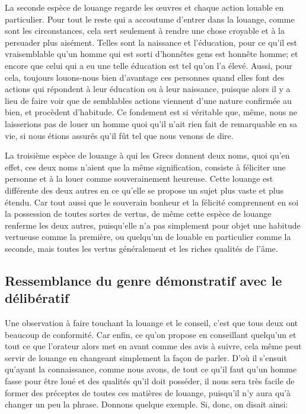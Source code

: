 La seconde espèce de louange regarde les œuvres et chaque action louable en particulier. Pour tout le reste qui a
accoutume d'entrer dans la louange, comme sont les circonstances, cela sert seulement à rendre une chose croyable
et à la persuader plus aisément. Telles sont la naissance et l'éducation, pour ce qu'il est vraisemblable qu'un
homme qui est sorti d'honnêtes gens est honnête homme; et encore que celui qui a eu une telle éducation est tel
qu'on l'a élevé. Aussi, pour cela, toujours louons-nous bien d'avantage ces personnes quand elles font des actions
qui répondent à leur éducation ou à leur naissance, puisque alors il y a lieu de faire voir que de semblables
actions viennent d'une nature confirmée au bien, et procèdent d'habitude. Ce fondement est si véritable que, même,
nous ne laisserions pas de louer un homme quoi qu'il n'ait rien fait de remarquable en sa vie, si nous étions
assurés qu'il fût tel que nous venons de dire.

\bigbreak

La troisième espèce de louange à qui les Grecs donnent deux noms, quoi qu'en effet, ces deux noms n'aient que la
même signification, consiste à féliciter une personne et à la louer comme souverainement heureuse. Cette louange
est différente des deux autres en ce qu'elle se propose un sujet plus vaste et plus étendu. Car tout aussi que le
souverain bonheur et la félicité comprennent en soi la possession de toutes sortes de vertus, de même cette espèce
de louange renferme les deux autres, puisqu'elle n'a pas simplement pour objet une habitude vertueuse comme la
première, ou quelqu'un de louable en particulier comme la seconde, mais toutes les vertus généralement et les
riches qualités de l'âme.

\subsection{Ressemblance du genre démonstratif avec le délibératif}

Une observation à faire touchant la louange et le conseil, c'est que tous deux ont beaucoup de conformité. Car
enfin, ce qu'on propose en conseillant quelqu'un et tout ce que l'orateur alors met en avant comme des avis à
suivre, cela même peut servir de louange en changeant simplement la façon de parler. D'où il s'ensuit qu'ayant
la connaissance, comme nous avons, de tout ce qu'il faut qu'un homme fasse pour être loué et des qualités qu'il
doit posséder, il nous sera très facile de former des préceptes de toutes ces matières de louange, puisqu'il n'y
aura qu'à changer un peu la phrase. Donnons quelque exemple. Si, donc, on disait ainsi:

